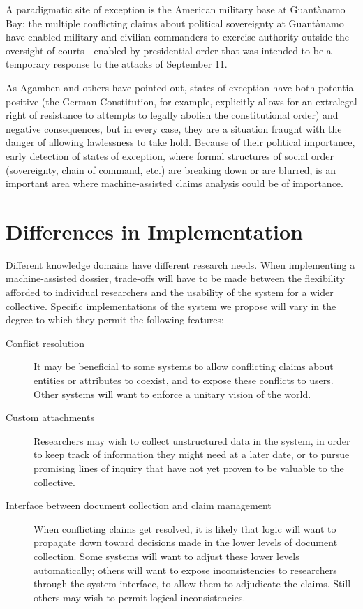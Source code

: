 \documentclass[format=siggraph, review=true]{acmart}
\begin{document}
A paradigmatic site of exception is the American military base at Guantànamo Bay; the multiple conflicting claims about political sovereignty at Guantànamo have enabled military and civilian commanders to exercise authority outside the oversight of courts—enabled by presidential order that was intended to be a temporary response to the attacks of September 11. 

As Agamben and others have pointed out, states of exception have both potential positive (the German Constitution, for example, explicitly allows for an extralegal right of resistance to attempts to legally abolish the constitutional order) and negative consequences, but in every case, they are a situation fraught with the danger of allowing lawlessness to take hold. Because of their political importance, early detection of states of exception, where formal structures of social order (sovereignty, chain of command, etc.) are breaking down or are blurred, is an important area where machine-assisted claims analysis could be of importance. 

\section{Differences in Implementation}

Different knowledge domains have different research needs. When
implementing a machine-assisted dossier, trade-offs will have to be made
between the flexibility afforded to individual researchers and the
usability of the system for a wider collective. Specific implementations
of the system we propose will vary in the degree to which they permit
the following features:

\begin{description}
  \item [Conflict resolution] It may be beneficial to some systems to
    allow conflicting claims about entities or attributes to coexist,
    and to expose these conflicts to users. Other systems will want
    to enforce a unitary vision of the world.

  \item [Custom attachments] Researchers may wish to collect unstructured
    data in the system, in order to keep track of information they might
    need at a later date, or to pursue promising lines of inquiry that
    have not yet proven to be valuable to the collective.

  \item [Interface between document collection and claim management] When
    conflicting claims get resolved, it is likely that logic will
    want to propagate down toward decisions made in the lower levels
    of document collection. Some systems will want to adjust these lower
    levels automatically; others will want to expose inconsistencies to
    researchers through the system interface, to allow them to adjudicate
    the claims. Still others may wish to permit logical inconsistencies.
\end{description}
\end{document}
